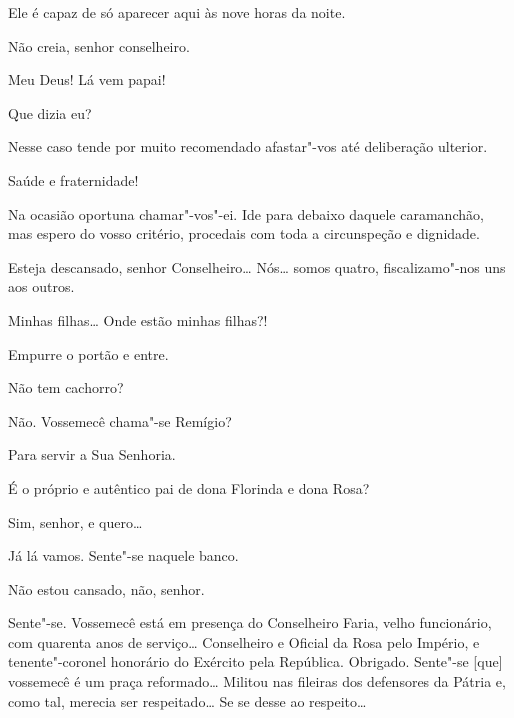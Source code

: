  Ele é capaz de só aparecer aqui às nove horas da noite.

 Não creia, senhor conselheiro.

  Meu Deus! Lá vem papai!

 Que dizia eu?

 Nesse caso tende por muito recomendado afastar"-vos até deliberação
ulterior.

  Saúde e fraternidade!

 Na ocasião oportuna chamar"-vos"-ei. Ide para debaixo daquele
caramanchão, mas espero do vosso critério, procedais com toda a circunspeção e
dignidade.

 Esteja descansado, senhor Conselheiro\ldots{} Nós\ldots{} somos quatro,
fiscalizamo"-nos uns aos outros. 




  Minhas filhas\ldots{} Onde estão minhas filhas?!

 Empurre o portão e entre.

 Não tem cachorro?

 Não.  Vossemecê chama"-se Remígio?

 Para servir a Sua Senhoria.

 É o próprio e autêntico pai de dona Florinda e dona
Rosa?

 Sim, senhor, e quero\ldots

 Já lá vamos. Sente"-se naquele banco.

 Não estou cansado, não, senhor.

 Sente"-se.   Vossemecê está em
presença do Conselheiro Faria, velho funcionário, com quarenta anos de
serviço\ldots{} Conselheiro e Oficial da Rosa pelo Império, e tenente"-coronel
honorário do Exército pela República.   Obrigado. Sente"-se [que] vossemecê é um praça
reformado\ldots{} Militou nas fileiras dos defensores da Pátria e, como tal, merecia
ser respeitado\ldots{} Se se desse ao respeito\ldots

